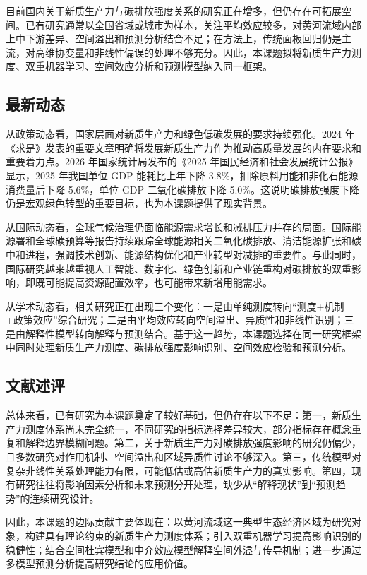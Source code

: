 \documentclass[UTF8,a4paper,zihao=-4,fontset=windows]{ctexart}
\newcommand{\regionscope}{黄河流域}
\begin{document}
目前国内关于新质生产力与碳排放强度关系的研究正在增多，但仍存在可拓展空间。已有研究通常以全国省域或城市为样本，关注平均效应较多，对黄河流域内部上中下游差异、空间溢出和预测分析结合不足；在方法上，传统面板回归仍是主流，对高维协变量和非线性偏误的处理不够充分。因此，本课题拟将新质生产力测度、双重机器学习、空间效应分析和预测模型纳入同一框架。

\subsection{最新动态}

从政策动态看，国家层面对新质生产力和绿色低碳发展的要求持续强化。2024 年《求是》发表的重要文章明确将发展新质生产力作为推动高质量发展的内在要求和重要着力点。2026 年国家统计局发布的《2025 年国民经济和社会发展统计公报》显示，2025 年我国单位 GDP 能耗比上年下降 3.8\%，扣除原料用能和非化石能源消费量后下降 5.6\%，单位 GDP 二氧化碳排放下降 5.0\%。这说明碳排放强度下降仍是宏观绿色转型的重要目标，也为本课题提供了现实背景。

从国际动态看，全球气候治理仍面临能源需求增长和减排压力并存的局面。国际能源署和全球碳预算等报告持续跟踪全球能源相关二氧化碳排放、清洁能源扩张和碳中和进程，强调技术创新、能源结构优化和产业转型对减排的重要性。与此同时，国际研究越来越重视人工智能、数字化、绿色创新和产业链重构对碳排放的双重影响，即既可能提高资源配置效率，也可能带来新增用能需求。

从学术动态看，相关研究正在出现三个变化：一是由单纯测度转向“测度+机制+政策效应”综合研究；二是由平均效应转向空间溢出、异质性和非线性识别；三是由解释性模型转向解释与预测结合。基于这一趋势，本课题选择在同一研究框架中同时处理新质生产力测度、碳排放强度影响识别、空间效应检验和预测分析。

\subsection{文献述评}

总体来看，已有研究为本课题奠定了较好基础，但仍存在以下不足：第一，新质生产力测度体系尚未完全统一，不同研究的指标选择差异较大，部分指标存在概念重复和解释边界模糊问题。第二，关于新质生产力对碳排放强度影响的研究仍偏少，且多数研究对作用机制、空间溢出和区域异质性讨论不够深入。第三，传统模型对复杂非线性关系处理能力有限，可能低估或高估新质生产力的真实影响。第四，现有研究往往将影响因素分析和未来预测分开处理，缺少从“解释现状”到“预测趋势”的连续研究设计。

因此，本课题的边际贡献主要体现在：以\regionscope 这一典型生态经济区域为研究对象，构建具有理论约束的新质生产力测度体系；引入双重机器学习提高影响识别的稳健性；结合空间杜宾模型和中介效应模型解释空间外溢与传导机制；进一步通过多模型预测分析提高研究结论的应用价值。
\end{document}
